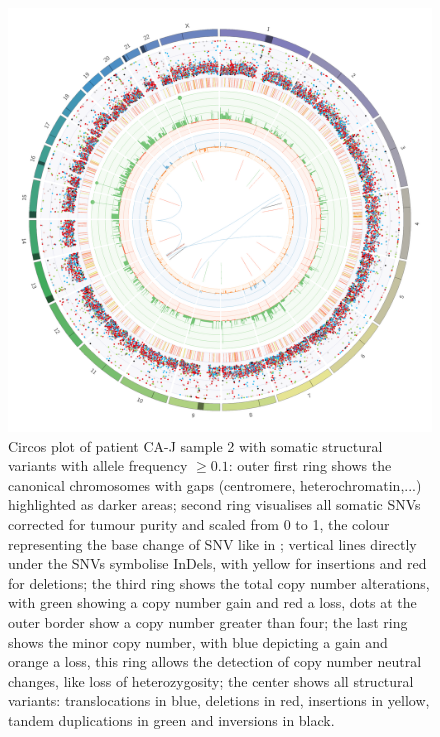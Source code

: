 \begin{figure}[ht]
\centering
\includegraphics[width=.99\linewidth]{Figures/CASCADE/CA80/CA80-2.circos.png}
\caption[Circos plot of patient CA-J sample 2]{Circos plot of patient CA-J sample 2 with somatic structural variants with allele frequency $\geq 0.1$: outer first ring shows the canonical chromosomes with gaps (centromere, heterochromatin,...) highlighted as darker areas; second ring visualises all somatic SNVs corrected for tumour purity and scaled from 0 to 1, the colour representing the base change of SNV like in \protect\textcite{Alexandrov2013}; vertical lines directly under the SNVs symbolise InDels, with yellow for insertions and red for deletions; the third ring shows the total copy number alterations, with green showing a copy number gain and red a loss, dots at the outer border show a copy number greater than four; the last ring shows the minor copy number, with blue depicting a gain and orange a loss, this ring allows the detection of copy number neutral changes, like loss of heterozygosity; the center shows all structural variants: translocations in blue, deletions in red, insertions in yellow, tandem duplications in green and inversions in black.} \label{fig:ca80.2circos}
\end{figure}

